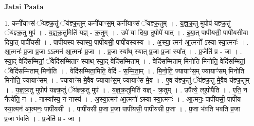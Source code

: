 \documentclass[17pt]{extarticle}
\begin{document}
\textbf{Jatai Paata} \newline

1. कनी॑याꣳसं ॅयज्ञ्क्र॒तुं ॅय॑ज्ञ्क्र॒तुम् कनी॑याꣳस॒म् कनी॑याꣳसं ॅयज्ञ्क्र॒तुम् । . य॒ज्ञ्॒क्र॒तु मुपोप॑ यज्ञ्क्र॒तुं ॅय॑ज्ञ्क्र॒तु मुप॑ । . य॒ज्ञ्॒क्र॒तुमिति॑ यज्ञ् - क्र॒तुम् । . उपे॑ या दिया॒ दुपोपे॑ यात् । . इ॒या॒त् पापी॑यसी॒ पापी॑यसीया दिया॒त् पापी॑यसी । . पापी॑यस्य स्यास्य॒ पापी॑यसी॒ पापी॑यस्यस्य । . अ॒स्या॒ त्मन॑ आ॒त्मनो᳚ ऽस्या स्या॒त्मनः॑ । . आ॒त्मनः॑ प्र॒जा प्र॒जा ऽऽत्मन॑ आ॒त्मनः॑ प्र॒जा । . प्र॒जा स्या᳚थ् स्यात् प्र॒जा प्र॒जा स्या᳚त् । . प्र॒जेति॑ प्र - जा । . स्या॒द् वेदि॑सम्मितां॒ ॅवेदि॑सम्मिताꣳ स्याथ् स्या॒द् वेदि॑सम्मिताम् । . वेदि॑सम्मिताम् मिनोति मिनोति॒ वेदि॑सम्मितां॒ ॅवेदि॑सम्मिताम् मिनोति । . वेदि॑सम्मिता॒मिति॒ वेदि॑ - स॒म्मि॒ता॒म् । . मि॒नो॒ति॒ ज्यायाꣳ॑स॒म् ज्यायाꣳ॑सम् मिनोति मिनोति॒ ज्यायाꣳ॑सम् । . ज्यायाꣳ॑स मे॒वैव ज्यायाꣳ॑स॒म् ज्यायाꣳ॑स मे॒व । . ए॒व य॑ज्ञ्क्र॒तुं ॅय॑ज्ञ्क्र॒तु मे॒वैव य॑ज्ञ्क्र॒तुम् । . य॒ज्ञ्॒क्र॒तु मुपोप॑ यज्ञ्क्र॒तुं ॅय॑ज्ञ्क्र॒तु मुप॑ । . य॒ज्ञ्॒क्र॒तुमिति॑ यज्ञ् - क्र॒तुम् । . उपै᳚त्ये॒ त्युपोपै॑ति । . ए॒ति॒ न नैत्ये॑ति॒ न । . नास्या᳚स्य॒ न नास्य॑ । . अ॒स्या॒त्मन॑ आ॒त्मनो᳚ ऽस्या स्या॒त्मनः॑ । . आ॒त्मनः॒ पापी॑यसी॒ पापी॑य स्या॒त्मन॑ आ॒त्मनः॒ पापी॑यसी । . पापी॑यसी प्र॒जा प्र॒जा पापी॑यसी॒ पापी॑यसी प्र॒जा । . प्र॒जा भ॑वति भवति प्र॒जा प्र॒जा भ॑वति । . प्र॒जेति॑ प्र - जा । \newline
\end{document}
